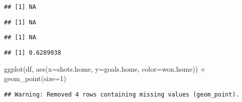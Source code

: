 \documentclass[
]{article}
\newenvironment{Shaded}{\begin{snugshade}}{\end{snugshade}}
\newcommand{\AttributeTok}[1]{\textcolor[rgb]{0.77,0.63,0.00}{#1}}
\newcommand{\DecValTok}[1]{\textcolor[rgb]{0.00,0.00,0.81}{#1}}
\newcommand{\FunctionTok}[1]{\textcolor[rgb]{0.00,0.00,0.00}{#1}}
\newcommand{\NormalTok}[1]{#1}
\newcommand{\SpecialCharTok}[1]{\textcolor[rgb]{0.00,0.00,0.00}{#1}}
\begin{document}
\begin{verbatim}
## [1] NA
\end{verbatim}

\begin{Shaded}
\end{Shaded}

\begin{verbatim}
## [1] NA
\end{verbatim}

\begin{Shaded}
\end{Shaded}

\begin{verbatim}
## [1] NA
\end{verbatim}

\begin{Shaded}
\end{Shaded}

\begin{verbatim}
## [1] 0.6289938
\end{verbatim}

\begin{Shaded}
\begin{Highlighting}[]
\FunctionTok{ggplot}\NormalTok{(df, }\FunctionTok{aes}\NormalTok{(}\AttributeTok{x=}\NormalTok{shots.home, }\AttributeTok{y=}\NormalTok{goals.home, }\AttributeTok{color=}\NormalTok{won.home)) }\SpecialCharTok{+} \FunctionTok{geom\_point}\NormalTok{(}\AttributeTok{size=}\DecValTok{1}\NormalTok{)}
\end{Highlighting}
\end{Shaded}

\begin{verbatim}
## Warning: Removed 4 rows containing missing values (geom_point).
\end{verbatim}
\end{document}
